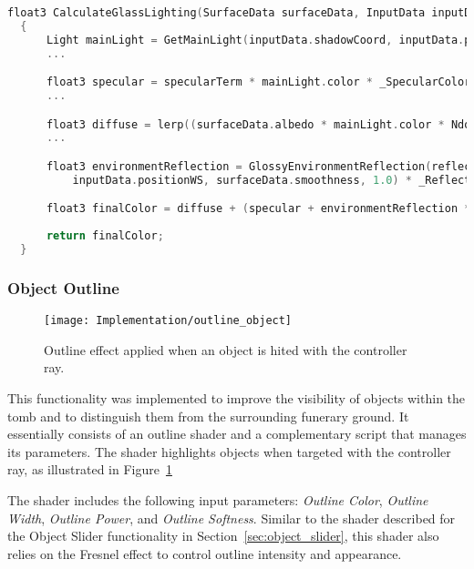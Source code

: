 \begin{lstlisting}[language=C++, caption={Lighting Glass Texture Partial Calculation.}, label={lst:lighting_glass}]
  float3 CalculateGlassLighting(SurfaceData surfaceData, InputData inputData, float fresnel)
  {
      Light mainLight = GetMainLight(inputData.shadowCoord, inputData.positionWS, inputData.shadowMask);
      ...

      float3 specular = specularTerm * mainLight.color * _SpecularColor.rgb * surfaceData.smoothness;
      ...

      float3 diffuse = lerp((surfaceData.albedo * mainLight.color * NdotL * 0.1),surfaceData.albedo, _BlendFactor);
      ...     

      float3 environmentReflection = GlossyEnvironmentReflection(reflectionVector, 
          inputData.positionWS, surfaceData.smoothness, 1.0) * _ReflectionIntensity;

      float3 finalColor = diffuse + (specular + environmentReflection * fresnel);
      
      return finalColor;
  }
\end{lstlisting}

\subsubsection{Object Outline}
\label{sec:object_outline}

 \begin{figure}[h!]
    \centering
    \texttt{[image: Implementation/outline\_object]}
    \caption{Outline effect applied when an object is hited with the controller ray.}
    \label{fig:outline_object}    
\end{figure}


This functionality was implemented to improve the visibility of objects within the tomb and to distinguish them from the surrounding funerary ground.  
It essentially consists of an outline shader and a complementary script that manages its parameters. 
The shader highlights objects when targeted with the controller ray, as illustrated in Figure~\ref{fig:outline_object}

The shader includes the following input parameters: \emph{Outline Color}, \emph{Outline Width}, \emph{Outline Power}, and \emph{Outline Softness}.  
Similar to the shader described for the Object Slider functionality in Section~\ref{sec:object_slider}, this shader also relies on the Fresnel effect to control outline intensity and appearance.  

